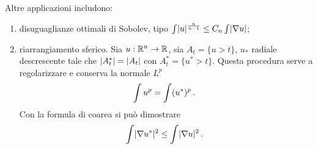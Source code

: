 Altre applicazioni includono:
\begin{enumerate}
	\item disuguaglianze ottimali di Sobolev, tipo $\int \lvert u\rvert^{\frac n{n-1}} \le C_n \int \lvert\nabla u\rvert$;
	
	\item riarrangiamento sferico. Sia $u:\mathbb R^n\to \mathbb R$, sia $A_t = \{ u> t \}$, $u_*$ radiale descrescente tale che $\lvert A_t^*\rvert = \lvert A_t\rvert$ con $A_t^* = \{u^*>t\}$. Questa procedura serve a regolarizzare e conserva la normale $L^p$
	\begin{equation*}
		\int u^p = \int (u^*)^p \, \text{. }
	\end{equation*}
	Con la formula di coarea si può dimostrare
	\begin{equation*}
		\int \lvert\nabla u^*\rvert^2 \le \int \lvert\nabla u\rvert^2 \, \text{. }
	\end{equation*}
	
\end{enumerate}






































